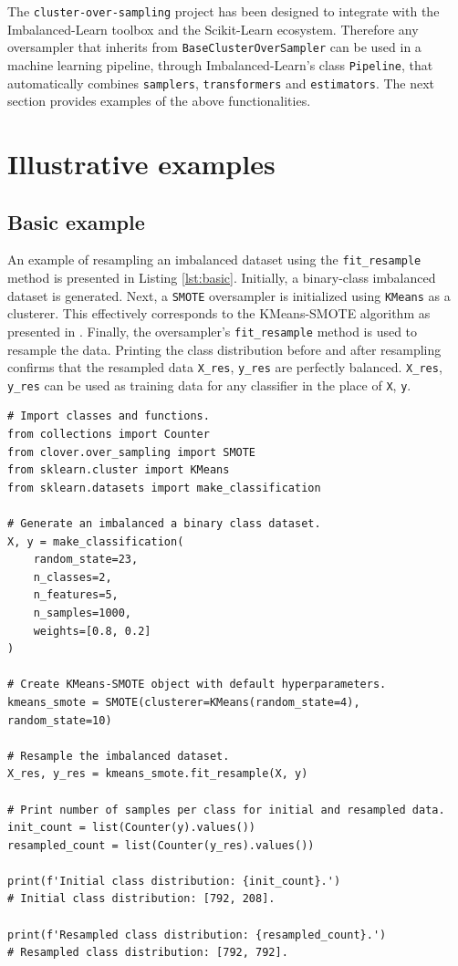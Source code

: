\documentclass[preprint,12pt, a4paper]{elsarticle}
\begin{document}
The \texttt{cluster-over-sampling} project has been designed to integrate with the Imbalanced-Learn toolbox and the Scikit-Learn ecosystem. Therefore any oversampler that inherits from \texttt{BaseClusterOverSampler} can be used in a machine learning pipeline, through Imbalanced-Learn's class \texttt{Pipeline}, that automatically combines \texttt{samplers}, \texttt{transformers} and \texttt{estimators}. The next section provides examples of the above functionalities.

\section{Illustrative examples}
\label{examples}

\subsection{Basic example}

An example of resampling an imbalanced dataset using the \texttt{fit\_resample} method is presented in Listing \ref{lst:basic}. Initially, a binary-class imbalanced dataset is generated. Next, a \texttt{SMOTE} oversampler is initialized using \texttt{KMeans} as a clusterer. This effectively corresponds to the KMeans-SMOTE algorithm as presented in \cite{Douzas2018}. Finally, the oversampler's \texttt{fit\_resample} method is used to resample the data. Printing the class distribution before and after resampling confirms that the resampled data \texttt{X\_res}, \texttt{y\_res} are perfectly balanced. \texttt{X\_res}, \texttt{y\_res} can be used as training data for any classifier in the place of \texttt{X}, \texttt{y}.

\begin{lstlisting}[caption={Resampling of imbalanced data using the \texttt{fit\_resample} method of KMeans-SMOTE oversampling algorithm.},label={lst:basic}]
# Import classes and functions.
from collections import Counter
from clover.over_sampling import SMOTE
from sklearn.cluster import KMeans
from sklearn.datasets import make_classification

# Generate an imbalanced a binary class dataset.
X, y = make_classification(
    random_state=23, 
	n_classes=2,
	n_features=5,
    n_samples=1000,
    weights=[0.8, 0.2]
)

# Create KMeans-SMOTE object with default hyperparameters.
kmeans_smote = SMOTE(clusterer=KMeans(random_state=4), random_state=10)

# Resample the imbalanced dataset.
X_res, y_res = kmeans_smote.fit_resample(X, y) 

# Print number of samples per class for initial and resampled data. 
init_count = list(Counter(y).values())
resampled_count = list(Counter(y_res).values())

print(f'Initial class distribution: {init_count}.') 
# Initial class distribution: [792, 208].

print(f'Resampled class distribution: {resampled_count}.')
# Resampled class distribution: [792, 792].
\end{lstlisting}
\end{document}
